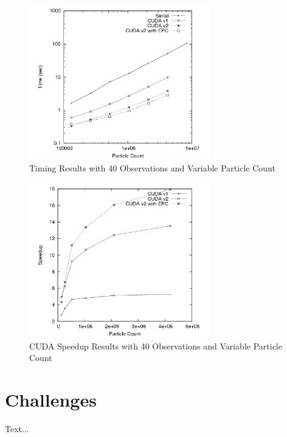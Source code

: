 \documentclass{article}
\begin{document}
\begin{figure}
\centering
\includegraphics[width=0.7\textwidth]{data/timing_results.png}
\caption{Timing Results with 40 Observations and Variable Particle Count}
\label{final_timing1}
\end{figure}

\begin{figure}
\centering
\includegraphics[width=0.7\textwidth]{data/timing_results_speedup.png}
\caption{CUDA Speedup Results with 40 Observations and Variable Particle Count}
\label{final_timing2}
\end{figure}

\section{Challenges}
Text...
\end{document}
